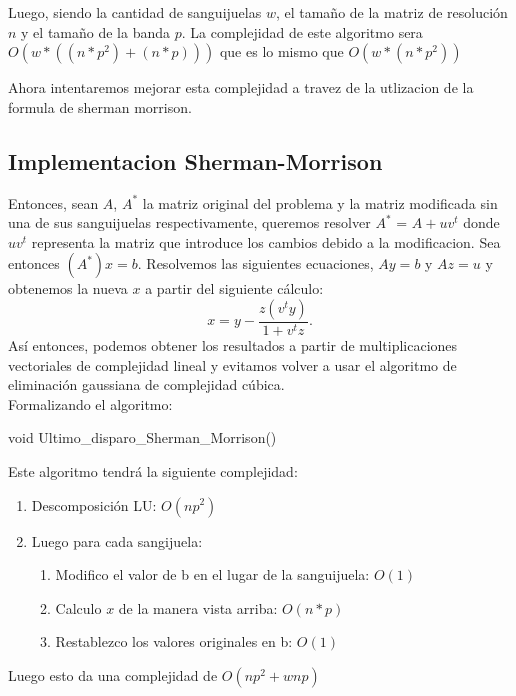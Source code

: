 Luego, siendo la cantidad de sanguijuelas $w$, el tamaño de la matriz de resoluci\'on $n$ y el tamaño de la banda $p$. La complejidad de este algoritmo sera $O(w*((n*p^2) + (n*p)) )$ que es lo mismo que $O(w*(n*p^2))$

Ahora intentaremos mejorar esta complejidad a travez de la utlizacion de la formula de sherman morrison.

\subsection{Implementacion Sherman-Morrison}
Entonces, sean $A$, $A^*$ la matriz original del problema y la matriz modificada sin una de sus sanguijuelas respectivamente, queremos resolver $A^*$ = $A + uv^t$ donde $uv^t$ representa la matriz que introduce los cambios debido a la modificacion. Sea entonces
$(A^*)x = b$. Resolvemos las siguientes ecuaciones, $Ay = b$ y $Az = u$ y obtenemos la nueva $x$ a partir del siguiente c\'alculo:
\begin{equation}
x = y - \frac{z(v^ty)}{1+v^tz}.
\end{equation}
As\'i entonces, podemos obtener los resultados a partir de multiplicaciones vectoriales de complejidad lineal y evitamos volver a usar el algoritmo de eliminaci\'on gaussiana de complejidad c\'ubica.
\\
Formalizando el algoritmo:
\begin{algorithm}
\begin{algorithmic}[1]\parskip=1mm
\caption{void Ultimo\_disparo\_Sherman\_Morrison()}
\end{algorithmic}
\end{algorithm}

Este algoritmo tendrá la siguiente complejidad:
\begin{enumerate}
 \item Descomposición LU: $O(np^2)$
 \item Luego para cada sangijuela:
\begin{enumerate}
\item Modifico el valor de b en el lugar de la sanguijuela: $O(1)$
\item Calculo $x$ de la manera vista arriba: $O(n*p)$
\item Restablezco los valores originales en b: $O(1)$
\end{enumerate}  
\end{enumerate}
Luego esto da una complejidad de $O(np^2 + wnp)$
